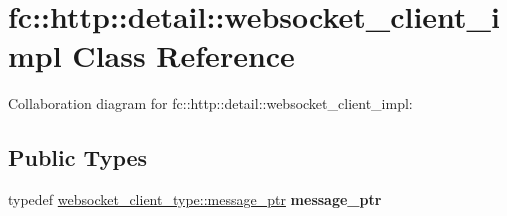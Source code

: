 \hypertarget{classfc_1_1http_1_1detail_1_1websocket__client__impl}{}\section{fc\+:\+:http\+:\+:detail\+:\+:websocket\+\_\+client\+\_\+impl Class Reference}
\label{classfc_1_1http_1_1detail_1_1websocket__client__impl}


Collaboration diagram for fc\+:\+:http\+:\+:detail\+:\+:websocket\+\_\+client\+\_\+impl\+:
\subsection*{Public Types}
\begin{DoxyCompactItemize}
\item 
\mbox{\label{classfc_1_1http_1_1detail_1_1websocket__client__impl_a73a991503b5ffd7829a7870e545799c3}} 
typedef \mbox{\hyperlink{classwebsocketpp_1_1endpoint_a585ecbbfd9689d4e4229e4c8378bd672}{websocket\+\_\+client\+\_\+type\+::message\+\_\+ptr}} {\bfseries message\+\_\+ptr}
\end{DoxyCompactItemize}
